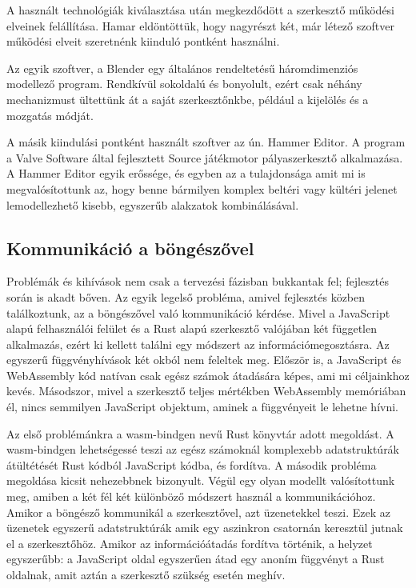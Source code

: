 A használt technológiák kiválasztása után megkezdődött a szerkesztő működési elveinek felállítása.
Hamar eldöntöttük, hogy nagyrészt két, már létező szoftver működési elveit szeretnénk kiinduló
pontként használni.

Az egyik szoftver, a Blender egy általános rendeltetésű háromdimenziós modellező program.
Rendkívül sokoldalú és bonyolult, ezért csak néhány mechanizmust ültettünk át a saját
szerkesztőnkbe, például a kijelölés és a mozgatás módját.

A másik kiindulási pontként használt szoftver az ún. Hammer Editor. A program a Valve Software
által fejlesztett Source játékmotor pályaszerkesztő alkalmazása. A Hammer Editor egyik erőssége,
és egyben az a tulajdonsága amit mi is megvalósítottunk az, hogy benne bármilyen komplex beltéri
vagy kültéri jelenet lemodellezhető kisebb, egyszerűb alakzatok kombinálásával.

\subsection{Kommunikáció a böngészővel}

Problémák és kihívások nem csak a tervezési fázisban bukkantak fel; fejlesztés során is akadt
bőven. Az egyik legelső probléma, amivel fejlesztés közben találkoztunk, az a böngészővel való
kommunikáció kérdése. Mivel a JavaScript alapú felhasználói felület és a Rust alapú szerkesztő
valójában két független alkalmazás, ezért ki kellett találni egy módszert az információmegosztásra.
Az egyszerű függvényhívások két okból nem feleltek meg. Először is, a JavaScript és WebAssembly
kód natívan csak egész számok átadására képes, ami mi céljainkhoz kevés. Másodszor, mivel a
szerkesztő teljes mértékben WebAssembly memóriában él, nincs semmilyen JavaScript objektum, aminek
a függvényeit le lehetne hívni.

Az első problémánkra a wasm-bindgen nevű Rust könyvtár adott megoldást. A wasm-bindgen lehetségessé
teszi az egész számoknál komplexebb adatstruktúrák átültétését Rust kódból JavaScript kódba, és
fordítva. A második probléma megoldása kicsit nehezebbnek bizonyult. Végül egy olyan
modellt valósítottunk meg, amiben a két fél két különböző módszert használ a kommunikációhoz.
Amikor a böngésző kommunikál a szerkesztővel, azt üzenetekkel teszi. Ezek az üzenetek egyszerű
adatstruktúrák amik egy aszinkron csatornán keresztül jutnak el a szerkesztőhöz. Amikor az
információátadás fordítva történik, a helyzet egyszerűbb: a JavaScript oldal egyszerűen átad egy
anoním függvényt a Rust oldalnak, amit aztán a szerkesztő szükség esetén meghív.

